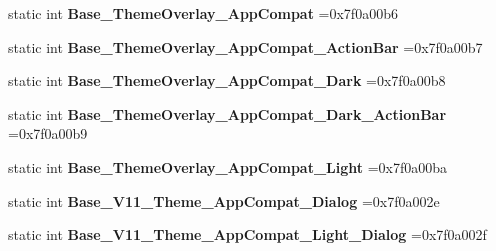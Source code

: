 \begin{DoxyCompactItemize}
\item 
\mbox{\label{classandroid_1_1support_1_1graphics_1_1drawable_1_1R_1_1style_a411d2c6470d4399b881018cef41c5148}} 
static int {\bfseries Base\+\_\+\+Theme\+Overlay\+\_\+\+App\+Compat} =0x7f0a00b6
\item 
\mbox{\label{classandroid_1_1support_1_1graphics_1_1drawable_1_1R_1_1style_aba1275b17042765f416bd5d2d437cacc}} 
static int {\bfseries Base\+\_\+\+Theme\+Overlay\+\_\+\+App\+Compat\+\_\+\+Action\+Bar} =0x7f0a00b7
\item 
\mbox{\label{classandroid_1_1support_1_1graphics_1_1drawable_1_1R_1_1style_afb12a26b3524586b69187e948d9a4b98}} 
static int {\bfseries Base\+\_\+\+Theme\+Overlay\+\_\+\+App\+Compat\+\_\+\+Dark} =0x7f0a00b8
\item 
\mbox{\label{classandroid_1_1support_1_1graphics_1_1drawable_1_1R_1_1style_aa6b6b81da26aecc9f21d04f209abdfb3}} 
static int {\bfseries Base\+\_\+\+Theme\+Overlay\+\_\+\+App\+Compat\+\_\+\+Dark\+\_\+\+Action\+Bar} =0x7f0a00b9
\item 
\mbox{\label{classandroid_1_1support_1_1graphics_1_1drawable_1_1R_1_1style_aa9c1afb829cb2fb23bc1cae9d4d07e07}} 
static int {\bfseries Base\+\_\+\+Theme\+Overlay\+\_\+\+App\+Compat\+\_\+\+Light} =0x7f0a00ba
\item 
\mbox{\label{classandroid_1_1support_1_1graphics_1_1drawable_1_1R_1_1style_af68f4a0ce384d12db52a77811ea0c18a}} 
static int {\bfseries Base\+\_\+\+V11\+\_\+\+Theme\+\_\+\+App\+Compat\+\_\+\+Dialog} =0x7f0a002e
\item 
\mbox{\label{classandroid_1_1support_1_1graphics_1_1drawable_1_1R_1_1style_a23c66c6305ffc53861caa44fb378d1d9}} 
static int {\bfseries Base\+\_\+\+V11\+\_\+\+Theme\+\_\+\+App\+Compat\+\_\+\+Light\+\_\+\+Dialog} =0x7f0a002f
\item 

\end{DoxyCompactItemize}
